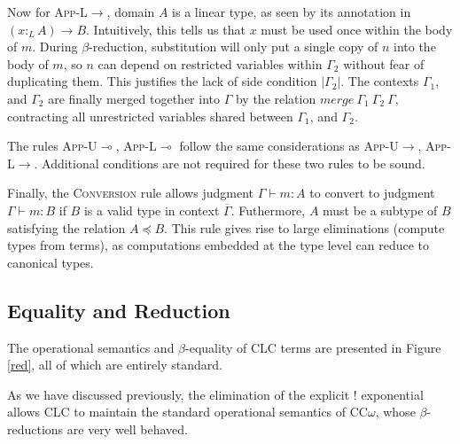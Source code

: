 \documentclass[sigplan,screen,review,anonymous]{acmart}
\newcommand{\rname}[1]{\textsc{\footnotesize #1}}
\newcommand{\pure}[1]{|#1|}
\newcommand{\ltype}{:_{\scriptscriptstyle L}}
\newcommand{\mrg}[3]{merge\ {#1}\ {#2}\ {#3}}
\begin{document}
Now for \rname{App-L$\rightarrow$}, domain $A$ is a linear type, as seen by its annotation in $(x \ltype A) \rightarrow B$. Intuitively, this tells us that $x$ must be used once within the body of $m$. During $\beta$-reduction, substitution will only put a single copy of $n$ into the body of $m$, so $n$ can depend on restricted variables within $\Gamma_2$ without fear of duplicating them. This justifies the lack of side condition $\pure{\Gamma_2}$. The contexts $\Gamma_1$, and $\Gamma_2$ are finally merged together into $\Gamma$ by the relation $\mrg{\Gamma_1}{\Gamma_2}{\Gamma}$, contracting all unrestricted variables shared between $\Gamma_1$, and $\Gamma_2$.

The rules \rname{App-U$\multimap$}, \rname{App-L$\multimap$} follow the same considerations as \rname{App-U$\rightarrow$}, \rname{App-L$\rightarrow$}. Additional conditions are not required for these two rules to be sound.

Finally, the \rname{Conversion} rule allows judgment $\Gamma \vdash m : A$ to convert to judgment $\Gamma \vdash m : B$ if $B$ is a valid type in context $\overline{\Gamma}$. Futhermore, $A$ must be a subtype of $B$ satisfying the relation $A \preceq B$. This rule gives rise to large eliminations (compute types from terms), as computations embedded at the type level can reduce to canonical types.

\subsection{Equality and Reduction} \label{reduction}
The operational semantics and $\beta$-equality of CLC terms are presented in Figure \ref{red}, all of which are entirely standard.

As we have discussed previously, the elimination of the explicit ! exponential allows CLC to maintain the standard operational semantics of CC$\omega$, whose $\beta$-reductions are very well behaved.
\end{document}
